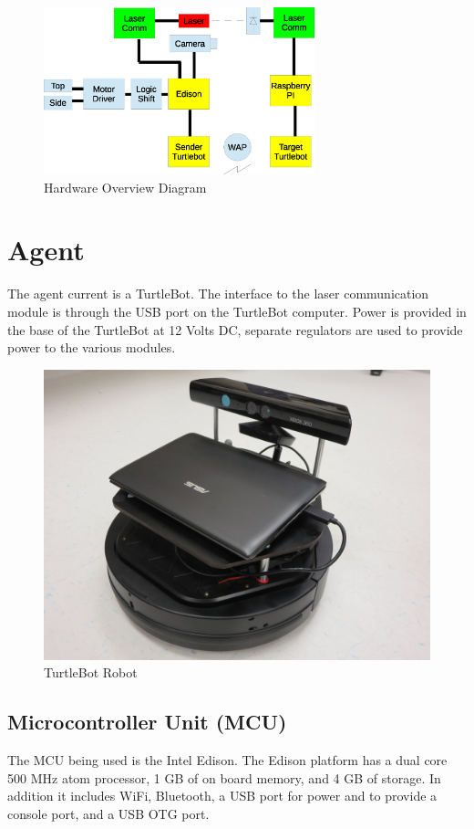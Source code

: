 \documentclass[botnum, fleqn]{unmeethesis}
\begin{document}
\begin{figure}[ht]
 \begin{center}
  \includegraphics[width=0.7\textwidth]{figures/SystemDiagram.eps}
  \caption{\small \label{fig:system_diagram} Hardware Overview Diagram}
 \end{center}
\end{figure}

\section*{Agent}
The agent current is a TurtleBot. The interface to the laser communication module is through the USB port on the TurtleBot computer. Power is provided in the base of the TurtleBot at 12 Volts DC, separate regulators are used to provide power to the various modules. 

\begin{figure}[ht]
 \begin{center}
  \includegraphics[width=0.5 \textwidth]{figures/TurtleBot.JPG}
  \caption{\small \label{fig:turtlebot} TurtleBot Robot}
 \end{center}
\end{figure}


\subsection*{Microcontroller Unit (MCU)}
The MCU being used is the Intel Edison. The Edison platform has a dual core 500 MHz atom processor, 1 GB of on board memory, and 4 GB of storage. In addition it includes WiFi, Bluetooth, a USB port for power and to provide a console port, and a USB OTG port. 
\end{document}
